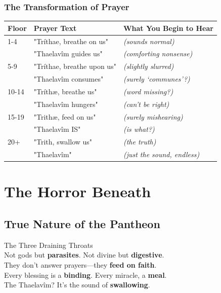 \documentclass[11pt,a4paper,twoside]{book}
\begin{document}
\subsection{The Transformation of Prayer}

\begin{adjustwidth}{1em}{1em}
\begin{tabular}{p{2cm}p{4cm}p{4cm}}
\textbf{Floor} & \textbf{Prayer Text} & \textbf{What You Begin to Hear} \\
\hline
1-4 & "Tríthae, breathe on us" & \textit{(sounds normal)} \\
 & "Thaelavîm guides us" & \textit{(comforting nonsense)} \\
5-9 & "Tríthae, breathe upon us" & \textit{(slightly slurred)} \\
 & "Thaelavîm consumes" & \textit{(surely ‘communes’?)} \\
10-14 & "Tríthæ, breathe us" & \textit{(word missing?)} \\
 & "Thaelavîm hungers" & \textit{(can’t be right)} \\
15-19 & "Trithæ, feed on us" & \textit{(surely mishearing)} \\
 & "Thaelavîm IS" & \textit{(is what?)} \\
20+ & "Trith, swallow us" & \textit{(the truth)} \\
 & "Thaelavîm" & \textit{(just the sound, endless)} \\
\end{tabular}
\end{adjustwidth}

\chapter{The Horror Beneath}

\section{True Nature of the Pantheon}

\begin{tcolorbox}[horrorbox={The Dæl Trith}]
\centering
\runefont\Large
The Three Draining Throats\\
\normalfont
\vspace{1em}
Not gods but \textbf{parasites}. Not divine but \textbf{digestive}.\\
They don't answer prayers—they \textbf{feed on faith}.\\
Every blessing is a \textbf{binding}. Every miracle, a \textbf{meal}.\\
The Thaelavîm? It's the sound of \textbf{swallowing}.
\end{tcolorbox}
\end{document}
